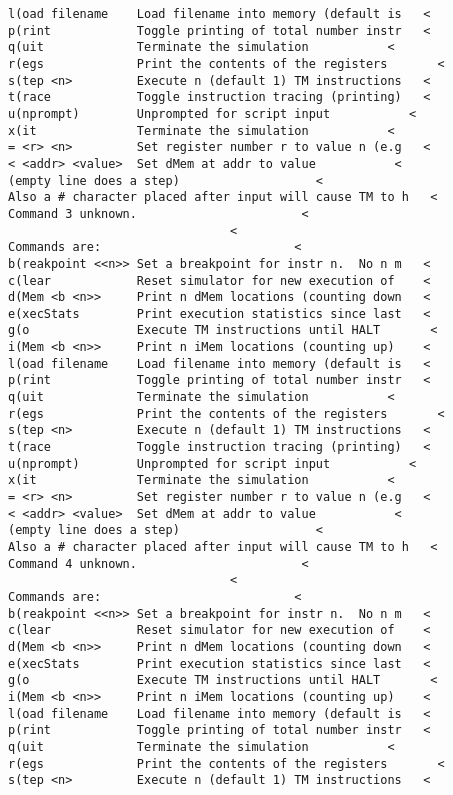 \documentclass[12pt]{book}
\begin{document}
\begin{lstlisting}
l(oad filename    Load filename into memory (default is   <
p(rint            Toggle printing of total number instr   <
q(uit             Terminate the simulation           <
r(egs             Print the contents of the registers       <
s(tep <n>         Execute n (default 1) TM instructions   <
t(race            Toggle instruction tracing (printing)   <
u(nprompt)        Unprompted for script input           <
x(it              Terminate the simulation           <
= <r> <n>         Set register number r to value n (e.g   <
< <addr> <value>  Set dMem at addr to value           <
(empty line does a step)                   <
Also a # character placed after input will cause TM to h   <
Command 3 unknown.                       <
                               <
Commands are:                           <
b(reakpoint <<n>> Set a breakpoint for instr n.  No n m   <
c(lear            Reset simulator for new execution of    <
d(Mem <b <n>>     Print n dMem locations (counting down   <
e(xecStats        Print execution statistics since last   <
g(o               Execute TM instructions until HALT       <
i(Mem <b <n>>     Print n iMem locations (counting up)    <
l(oad filename    Load filename into memory (default is   <
p(rint            Toggle printing of total number instr   <
q(uit             Terminate the simulation           <
r(egs             Print the contents of the registers       <
s(tep <n>         Execute n (default 1) TM instructions   <
t(race            Toggle instruction tracing (printing)   <
u(nprompt)        Unprompted for script input           <
x(it              Terminate the simulation           <
= <r> <n>         Set register number r to value n (e.g   <
< <addr> <value>  Set dMem at addr to value           <
(empty line does a step)                   <
Also a # character placed after input will cause TM to h   <
Command 4 unknown.                       <
                               <
Commands are:                           <
b(reakpoint <<n>> Set a breakpoint for instr n.  No n m   <
c(lear            Reset simulator for new execution of    <
d(Mem <b <n>>     Print n dMem locations (counting down   <
e(xecStats        Print execution statistics since last   <
g(o               Execute TM instructions until HALT       <
i(Mem <b <n>>     Print n iMem locations (counting up)    <
l(oad filename    Load filename into memory (default is   <
p(rint            Toggle printing of total number instr   <
q(uit             Terminate the simulation           <
r(egs             Print the contents of the registers       <
s(tep <n>         Execute n (default 1) TM instructions   <

\end{lstlisting}
\end{document}
